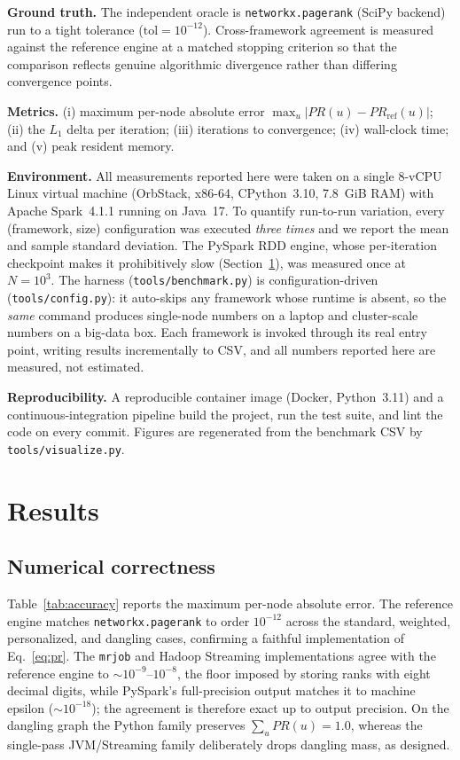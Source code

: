 \textbf{Ground truth.} The independent oracle is \texttt{networkx.pagerank}
(SciPy backend) run to a tight tolerance ($\text{tol}=10^{-12}$). Cross-framework
agreement is measured against the reference engine at a matched stopping
criterion so that the comparison reflects genuine algorithmic divergence rather
than differing convergence points.

\textbf{Metrics.} (i) maximum per-node absolute error
$\max_u|PR(u)-PR_{\text{ref}}(u)|$; (ii) the $L_1$ delta per iteration; (iii)
iterations to convergence; (iv) wall-clock time; and (v) peak resident memory.

\textbf{Environment.} All measurements reported here were taken on a single
8-vCPU Linux virtual machine (OrbStack, x86-64, CPython~3.10, 7.8~GiB RAM) with
Apache Spark~4.1.1 running on Java~17. To quantify run-to-run variation, every
(framework, size) configuration was executed \emph{three times} and we report the
mean and sample standard deviation. The PySpark RDD engine, whose per-iteration
checkpoint makes it prohibitively slow (Section~\ref{sec:results}), was measured
once at $N=10^3$. The harness
(\texttt{tools/benchmark.py}) is configuration-driven (\texttt{tools/config.py}):
it auto-skips any framework whose runtime is absent, so the \emph{same} command
produces single-node numbers on a laptop and cluster-scale numbers on a big-data
box. Each framework is invoked through its real entry point, writing results
incrementally to CSV, and all numbers reported here are measured, not estimated.

\textbf{Reproducibility.} A reproducible container image (Docker, Python~3.11)
and a continuous-integration pipeline build the project, run the test suite, and
lint the code on every commit. Figures are regenerated from the benchmark CSV by
\texttt{tools/visualize.py}.

\section{Results}
\label{sec:results}
\subsection{Numerical correctness}
Table~\ref{tab:accuracy} reports the maximum per-node absolute error. The
reference engine matches \texttt{networkx.pagerank} to order $10^{-12}$ across
the standard, weighted, personalized, and dangling cases, confirming a faithful
implementation of Eq.~\eqref{eq:pr}. The \texttt{mrjob} and Hadoop Streaming
implementations agree with the reference engine to $\sim\!10^{-9}$--$10^{-8}$, the
floor imposed by storing ranks with eight decimal digits, while PySpark's
full-precision output matches it to machine epsilon ($\sim\!10^{-18}$); the
agreement is therefore exact up to output precision. On the dangling graph
the Python family preserves $\sum_u PR(u)=1.0$, whereas the single-pass
JVM/Streaming family deliberately drops dangling mass, as designed.

